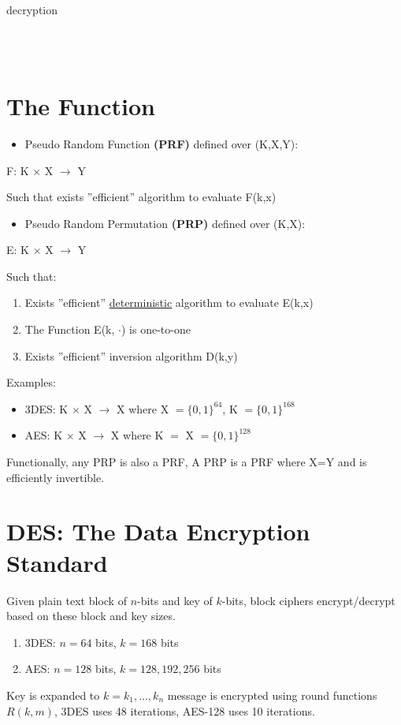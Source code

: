 \documentclass[a4paper]{article}
\begin{document}
	decryption
	

	\\\\
	\section{The Function}
	\begin{itemize}
		\item Pseudo Random Function {\bf{(PRF)}} defined over (K,X,Y):
	\end{itemize}
	\begin{center}
		F: K $\times$ X $\to $ Y
	\end{center}
	Such that exists ''efficient'' algorithm to evaluate F(k,x)\\
	\begin{itemize}
		\item Pseudo Random Permutation {\bf{(PRP)}} defined over (K,X):
	\end{itemize}
	\begin{center}
		E: K $\times$ X $\to$ Y
	\end{center}
	Such that:
	\begin{enumerate}
		\item Exists ''efficient'' \underline{deterministic} algorithm
			to evaluate E(k,x)
		\item The Function E(k,  $\cdot$) is one-to-one
		\item Exists ''efficient'' inversion algorithm D(k,y)
	\end{enumerate}
	Examples:
	\begin{itemize}
		\item 3DES: K $\times $ X $\to $ X where X $=\{0,1\}^{64}$, K $=\{0,1\}^{168}$ 
		\item AES: K $\times $ X $\to $ X where K $=$ X $= \{0,1\}^{128}$
	\end{itemize}
	Functionally, any PRP is also a PRF, A PRP is a PRF where X=Y and is efficiently invertible.\\
	\section{DES: The Data Encryption Standard}
	Given plain text block of $n$-bits and key of  $k$-bits, block ciphers
	encrypt/decrypt based on these block and key sizes.
	\begin{enumerate}
		\item 3DES: $n = 64$ bits, $k = 168$ bits
		\item AES: $n = 128$ bits, $k = 128, 192, 256$ bits
	\end{enumerate}
	Key is expanded to $k=k_1,\ldots,k_n$ message is encrypted using round
	functions $R(k,m)$, 3DES uses 48 iterations, AES-128 uses 10 iterations.
	\pagebreak
\end{document}
